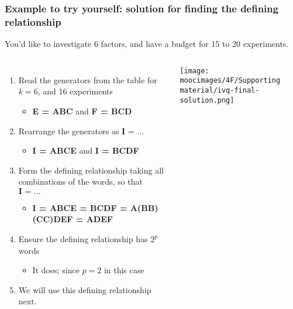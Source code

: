 \documentclass[handout,11pt,aspectratio=169,mathserif]{beamer}
\begin{document}
\begin{frame}\frametitle{Example to try yourself: {\color{myOrange}solution} for finding the defining relationship}
	
	\vspace{0.5cm}
	You'd like to investigate 6 factors, and have a budget for 15 to 20 experiments.
	
	\vspace{0.5cm}
	\begin{columns}[T]
			\begin{enumerate}
				\item	Read the generators from the table for $k=6$, and 16 experiments
					\begin{itemize}
						\item	\textbf{E = ABC}	and  \textbf{F = BCD}
					\end{itemize}
				\item	Rearrange the generators as  $\textbf{I = \ldots}$
					\begin{itemize}
						\item	\textbf{I = ABCE}	and  \textbf{I = BCDF}
					\end{itemize}
			 	\item	Form the {\color{purple}defining relationship} taking all combinations of the words, so that $\textbf{I = \ldots}$
					\begin{itemize}
						\item	\textbf{I = ABCE = BCDF = A(BB)(CC)DEF = ADEF}
					\end{itemize}
			 	\item	Ensure the defining relationship has $2^p$ words
					\begin{itemize}
						\item	It does; since $p=2$ in this case
					\end{itemize} 
				\item	We will use this defining relationship next.
			\end{enumerate}
			
			\centerline{\texttt{[image: \\moocimages/4F/Supporting material/ivq-final-solution.png]}}

	\end{columns}

	
\end{frame}


\end{document}
